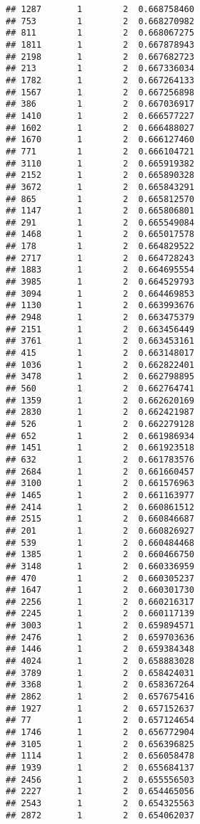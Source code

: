 \documentclass[
]{article}
\begin{document}
\begin{verbatim}
## 1287       1        2  0.668758460
## 753        1        2  0.668270982
## 811        1        2  0.668067275
## 1811       1        2  0.667878943
## 2198       1        2  0.667682723
## 213        1        2  0.667336034
## 1782       1        2  0.667264133
## 1567       1        2  0.667256898
## 386        1        2  0.667036917
## 1410       1        2  0.666577227
## 1602       1        2  0.666488027
## 1670       1        2  0.666127460
## 771        1        2  0.666104721
## 3110       1        2  0.665919382
## 2152       1        2  0.665890328
## 3672       1        2  0.665843291
## 865        1        2  0.665812570
## 1147       1        2  0.665806801
## 291        1        2  0.665549084
## 1468       1        2  0.665017578
## 178        1        2  0.664829522
## 2717       1        2  0.664728243
## 1883       1        2  0.664695554
## 3985       1        2  0.664529793
## 3094       1        2  0.664469853
## 1130       1        2  0.663993676
## 2948       1        2  0.663475379
## 2151       1        2  0.663456449
## 3761       1        2  0.663453161
## 415        1        2  0.663148017
## 1036       1        2  0.662822401
## 3478       1        2  0.662798895
## 560        1        2  0.662764741
## 1359       1        2  0.662620169
## 2830       1        2  0.662421987
## 526        1        2  0.662279128
## 652        1        2  0.661986934
## 1451       1        2  0.661923518
## 632        1        2  0.661783576
## 2684       1        2  0.661660457
## 3100       1        2  0.661576963
## 1465       1        2  0.661163977
## 2414       1        2  0.660861512
## 2515       1        2  0.660846687
## 201        1        2  0.660826927
## 539        1        2  0.660484468
## 1385       1        2  0.660466750
## 3148       1        2  0.660336959
## 470        1        2  0.660305237
## 1647       1        2  0.660301730
## 2256       1        2  0.660216317
## 2245       1        2  0.660117139
## 3003       1        2  0.659894571
## 2476       1        2  0.659703636
## 1446       1        2  0.659384348
## 4024       1        2  0.658883028
## 3789       1        2  0.658424031
## 3368       1        2  0.658367264
## 2862       1        2  0.657675416
## 1927       1        2  0.657152637
## 77         1        2  0.657124654
## 1746       1        2  0.656772904
## 3105       1        2  0.656396825
## 1114       1        2  0.656058478
## 1939       1        2  0.655684137
## 2456       1        2  0.655556503
## 2227       1        2  0.654465056
## 2543       1        2  0.654325563
## 2872       1        2  0.654062037

\end{verbatim}
\end{document}
